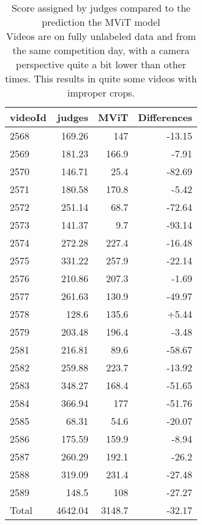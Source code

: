 \begin{table}[h!]
    \begin{tabular}{|l|r|r|r|}
        \hline
        videoId & judges    & MViT         & Differences \\ \hline
        2568	& 169.26	&   147	       & -13.15 \\
        2569	& 181.23	&   166.9	   & -7.91  \\
        2570	& 146.71	&   25.4	   & -82.69 \\
        2571	& 180.58	&   170.8	   & -5.42  \\
        2572	& 251.14	&   68.7       & -72.64 \\
        2573	& 141.37	&   9.7	       & -93.14 \\
        2574	& 272.28	&   227.4	   & -16.48 \\
        2575	& 331.22	&   257.9	   & -22.14 \\
        2576	& 210.86	&   207.3	   & -1.69  \\
        2577	& 261.63	&   130.9	   & -49.97 \\
        2578	& 128.6	    &   135.6	   & +5.44  \\
        2579	& 203.48	&   196.4	   & -3.48  \\
        2581	& 216.81	&   89.6	   & -58.67 \\
        2582	& 259.88	&   223.7	   & -13.92 \\
        2583	& 348.27	&   168.4	   & -51.65 \\
        2584	& 366.94	&   177 	   & -51.76 \\
        2585	& 68.31	    &   54.6	   & -20.07 \\
        2586	& 175.59	&   159.9	   & -8.94  \\
        2587	& 260.29	&   192.1	   & -26.2  \\
        2588	& 319.09	&   231.4	   & -27.48 \\
        2589	& 148.5	    &   108 	   & -27.27 \\ \hline
        Total   & 4642.04	&   3148.7	   & -32.17 \\ \hline
    \end{tabular}
    \caption[judge diff score compared to MViT]{Score assigned by judges compared to the prediction the MViT model \\
    Videos are on fully unlabeled data and from the same competition day, with a camera perspective quite a bit lower than other times.
    This results in quite some videos with improper crops.}
    \label{tbl:judge-score-comparison}
\end{table}

